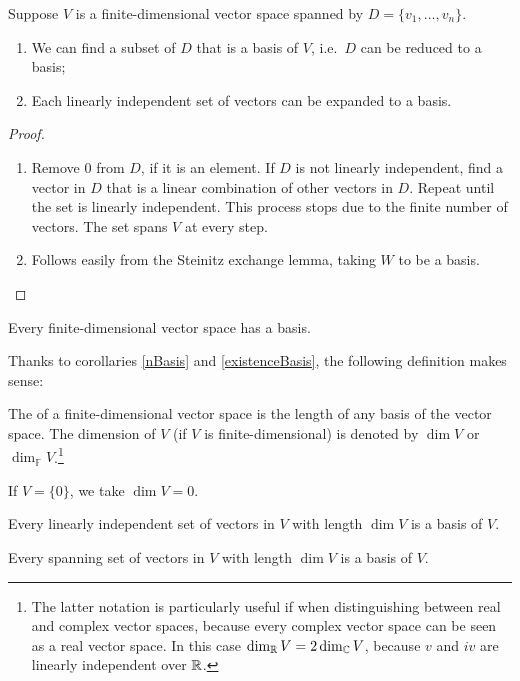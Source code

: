 \begin{theorem} \label{extensionReductionBasisFiniteDimensions}
Suppose $V$ is a finite-dimensional vector space spanned by $D = \{v_1, \ldots, v_n\}$.
\begin{enumerate}
\item We can find a subset of $D$ that is a basis of $V$, i.e.\ $D$ can be reduced to a basis;
\item Each linearly independent set of vectors can be expanded to a basis.
\end{enumerate}
\label{basis}
\end{theorem}
\begin{proof}
\begin{enumerate}
\item Remove $0$ from $D$, if it is an element. If $D$ is not linearly independent, find a vector in $D$ that is a linear combination of other vectors in $D$. Repeat until the set is linearly independent. This process stops due to the finite number of vectors. The set spans $V$ at every step.
\item Follows easily from the Steinitz exchange lemma, taking $W$ to be a basis.
\end{enumerate}
\end{proof}
\begin{corollary}
Every finite-dimensional vector space has a basis. \label{existenceBasis}
\end{corollary}

Thanks to corollaries \ref{nBasis} and \ref{existenceBasis}, the following definition makes sense:
\begin{definition}
The  of a finite-dimensional vector space is the length of any basis of the vector space.
The dimension of $V$ (if $V$ is finite-dimensional) is denoted by $\dim V$ or $\dim_\mathbb{F}V$.\footnote{The latter notation is particularly useful if when distinguishing between real and complex vector spaces, because every complex vector space can be seen as a real vector space. In this case $\dim_{\mathbb{R}} V = 2\dim_{\mathbb{C}} V$, because $v$ and $iv$ are linearly independent over $\mathbb{R}$.}

If $V = \{0\}$, we take $\dim V = 0$.
\end{definition}

\begin{corollary}
Every linearly independent set of vectors in $V$ with length $\dim V$ is a basis of $V$. \label{maxLinearlyIndependent}
\end{corollary}
\begin{corollary}
Every spanning set of vectors in $V$ with length $\dim V$ is a basis of $V$.
\end{corollary}

